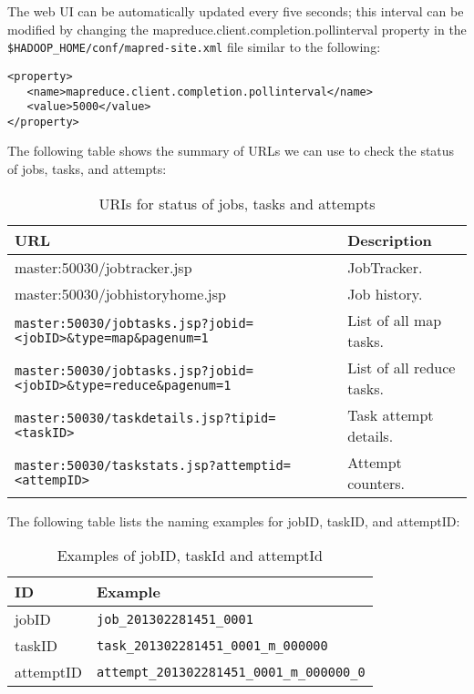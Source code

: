     The web UI can be automatically updated every five seconds; this interval can be modified by changing the mapreduce.client.completion.pollinterval property in the \verb|$HADOOP_HOME/conf/mapred-site.xml| file similar to the following:
\begin{verbatim}
<property>
   <name>mapreduce.client.completion.pollinterval</name>
   <value>5000</value>
</property>
\end{verbatim}

The following table shows the summary of URLs we can use to check the status of jobs, tasks, and attempts:
\begin{table}
  \footnotesize
  \centering
  \begin{tabular}{ll}
    \toprule 
    \textbf{URL} & \textbf{Description} \\ \midrule
    master:50030/jobtracker.jsp & JobTracker.\\
    master:50030/jobhistoryhome.jsp & Job history. \\
    \verb|master:50030/jobtasks.jsp?jobid=<jobID>&type=map&pagenum=1| & List of all map tasks. \\
    \verb|master:50030/jobtasks.jsp?jobid=<jobID>&type=reduce&pagenum=1| & List of all reduce tasks. \\
    \verb|master:50030/taskdetails.jsp?tipid=<taskID>| & Task attempt details. \\
    \verb|master:50030/taskstats.jsp?attemptid=<attempID>| & Attempt counters.\\ \bottomrule
  \end{tabular}
  \caption{URIs for status of jobs, tasks and attempts}\label{tbl:statusuris}
\end{table}

The following table lists the naming examples for jobID, taskID, and attemptID:
\begin{table}
  \centering
  \begin{tabular}{ll}
    \toprule 
    \textbf{ID} & \textbf{Example} \\ \midrule
    jobID & \verb|job_201302281451_0001| \\ 
    taskID & \verb|task_201302281451_0001_m_000000| \\
    attemptID & \verb|attempt_201302281451_0001_m_000000_0| \\ \bottomrule
  \end{tabular}
  \caption{Examples of jobID, taskId and attemptId}\label{tbl:ids}
\end{table}

